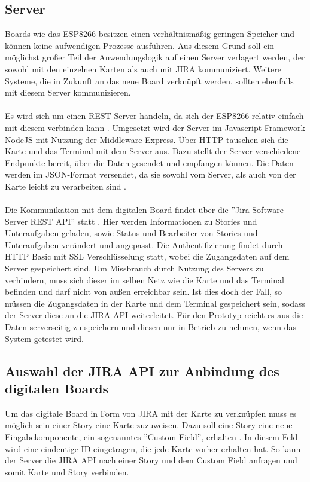 \documentclass[12pt,titlepage]{scrartcl}
\begin{document}
		\subsection{Server} \label{techserver}
		Boards wie das ESP8266 besitzen einen verhältnismäßig geringen Speicher und können keine aufwendigen Prozesse ausführen. Aus diesem Grund soll ein möglichst großer Teil der Anwendungslogik auf einen Server verlagert werden, der sowohl mit den einzelnen Karten als auch mit JIRA kommuniziert. Weitere Systeme, die in Zukunft an das neue Board verknüpft werden, sollten ebenfalls mit diesem Server kommunizieren. \\ \\
		Es wird sich um einen REST-Server handeln, da sich der ESP8266 relativ einfach mit diesem verbinden kann \cite{nodemcuexamples}. Umgesetzt wird der Server im Javascript-Framework NodeJS mit Nutzung der Middleware Express. Über HTTP tauschen sich die Karte und das Terminal mit dem Server aus. Dazu stellt der Server verschiedene Endpunkte bereit, über die Daten gesendet und empfangen können. Die Daten werden im JSON-Format versendet, da sie sowohl vom Server, als auch von der Karte leicht zu verarbeiten sind \cite{arduinojson}. \\ \\
		Die Kommunikation mit dem digitalen Board findet über die ''Jira Software Server REST API'' statt \cite{jiraapi}. Hier werden Informationen zu Stories und Unteraufgaben geladen, sowie Status und Bearbeiter von Stories und Unteraufgaben verändert und angepasst. Die Authentifizierung findet durch HTTP Basic mit SSL Verschlüsselung statt, wobei die Zugangsdaten auf dem Server gespeichert sind. Um Missbrauch durch Nutzung des Servers zu verhindern, muss sich dieser im selben Netz wie die Karte und das Terminal befinden und darf nicht von außen erreichbar sein. Ist dies doch der Fall, so müssen die Zugangsdaten in der Karte und dem Terminal gespeichert sein, sodass der Server diese an die JIRA API weiterleitet. Für den Prototyp reicht es aus die Daten serverseitig zu speichern und diesen nur in Betrieb zu nehmen, wenn das System getestet wird.
		\subsection{Auswahl der JIRA API zur Anbindung des digitalen Boards}
		Um das digitale Board in Form von JIRA mit der Karte zu verknüpfen muss es möglich sein einer Story eine Karte zuzuweisen. Dazu soll eine Story eine neue Eingabekomponente, ein sogenanntes ''Custom Field'', erhalten \cite{jiracustomfield}. In diesem Feld wird eine eindeutige ID eingetragen, die jede Karte vorher erhalten hat. So kann der Server die JIRA API nach einer Story und dem Custom Field anfragen und somit Karte und Story verbinden. 
	\newpage
\end{document}
